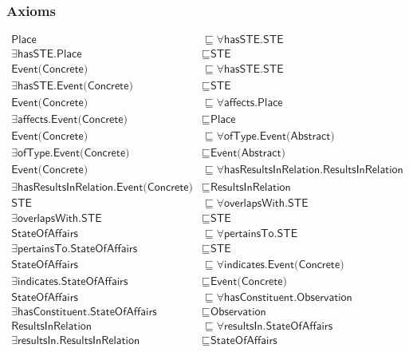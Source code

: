 \subsubsection{Axioms}
\begin{align}
  \textsf{Place} &\sqsubseteq \forall \textsf{hasSTE.STE} \\
  \exists \textsf{hasSTE.Place} &\sqsubseteq \textsf{STE} \\
  \textsf{Event(Concrete)} &\sqsubseteq \forall \textsf{hasSTE.STE} \\
  \exists \textsf{hasSTE.Event(Concrete)} &\sqsubseteq \textsf{STE} \\
  \textsf{Event(Concrete)} &\sqsubseteq \forall \textsf{affects.Place} \\
  \exists \textsf{affects.Event(Concrete)} &\sqsubseteq \textsf{Place} \\
  \textsf{Event(Concrete)} &\sqsubseteq \forall \textsf{ofType.Event(Abstract)} \\
  \exists \textsf{ofType.Event(Concrete)} &\sqsubseteq \textsf{Event(Abstract)} \\
  \textsf{Event(Concrete)} &\sqsubseteq \forall \textsf{hasResultsInRelation.ResultsInRelation} \\
  \exists \textsf{hasResultsInRelation.Event(Concrete)} &\sqsubseteq \textsf{ResultsInRelation} \\
  \textsf{STE} &\sqsubseteq \forall \textsf{overlapsWith.STE} \\
  \exists \textsf{overlapsWith.STE} &\sqsubseteq \textsf{STE} \\
  \textsf{StateOfAffairs} &\sqsubseteq \forall \textsf{pertainsTo.STE} \\
  \exists \textsf{pertainsTo.StateOfAffairs} &\sqsubseteq \textsf{STE} \\
  \textsf{StateOfAffairs} &\sqsubseteq \forall \textsf{indicates.Event(Concrete)} \\
  \exists \textsf{indicates.StateOfAffairs} &\sqsubseteq \textsf{Event(Concrete)} \\
  \textsf{StateOfAffairs} &\sqsubseteq \forall \textsf{hasConstituent.Observation} \\
  \exists \textsf{hasConstituent.StateOfAffairs} &\sqsubseteq \textsf{Observation} \\
  \textsf{ResultsInRelation} &\sqsubseteq \forall \textsf{resultsIn.StateOfAffairs} \\
  \exists \textsf{resultsIn.ResultsInRelation} &\sqsubseteq \textsf{StateOfAffairs} \\

\end{align}
